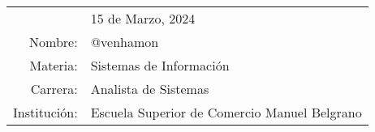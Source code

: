 
\hfill
\begin{tabular}{rl @{}}
	$ $ &
	15 de Marzo, 2024
	\bigskip\\ %
Nombre:     &
@venhamon
\\
Materia:     & Sistemas de Información  \\
Carrera: & Analista de Sistemas \\
Institución:    & Escuela Superior de Comercio Manuel Belgrano  \\
\end{tabular}
\bigskip %

\pagestyle{plain}
\renewcommand{\baselinestretch}{0.65}\normalsize
\tableofcontents
\renewcommand{\baselinestretch}{1.0}\normalsize

\clearpage
